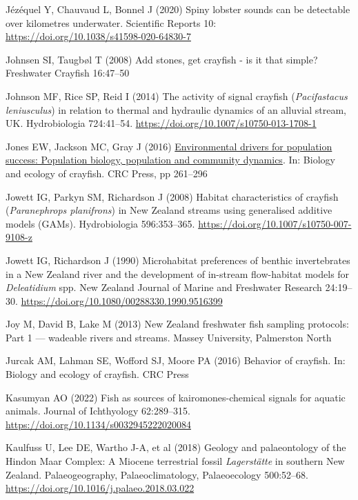 \documentclass[
  12pt,
  a4paper,
  oneside]{scrbook}
\newlength{\cslhangindent}
\newenvironment{CSLReferences}[2] %
 {\begin{list}{}{%
  \setlength{\itemindent}{0pt}
  \setlength{\leftmargin}{0pt}
  \setlength{\parsep}{0pt}
  \ifodd #1
   \setlength{\leftmargin}{\cslhangindent}
   \setlength{\itemindent}{-1\cslhangindent}
  \fi
  \setlength{\itemsep}{#2\baselineskip}}}
 {\end{list}}
\renewenvironment{CSLReferences}[2]
   {\begin{list}{}{%
    \setlength{\itemindent}{0pt}
    \setlength{\leftmargin}{0pt}
    \setlength{\parsep}{0pt}
    \ifodd #1
     \setlength{\leftmargin}{\cslhangindent}
     \setlength{\itemindent}{-1\cslhangindent}
    \fi
    \setlength{\itemsep}{0.3\baselineskip}}}
   {\end{list}}%
\begin{document}
\begin{CSLReferences}{1}{1}
Jézéquel Y, Chauvaud L, Bonnel J (2020) Spiny lobster sounds can be
detectable over kilometres underwater. Scientific Reports 10:
\url{https://doi.org/10.1038/s41598-020-64830-7}

Johnsen SI, Taugbøl T (2008) Add stones, get crayfish - is it that
simple? Freshwater Crayfish 16:47--50

Johnson MF, Rice SP, Reid I (2014) The activity of signal crayfish
({\emph{Pacifastacus leniusculus}}) in relation to thermal and hydraulic
dynamics of an alluvial stream, {UK}. Hydrobiologia 724:41--54.
\url{https://doi.org/10.1007/s10750-013-1708-1}

Jones EW, Jackson MC, Gray J (2016)
\href{https://doi.org/10.1201/b20073-10}{Environmental drivers for
population success: Population biology, population and community
dynamics}. In: Biology and ecology of crayfish. CRC Press, pp 261--296

Jowett IG, Parkyn SM, Richardson J (2008) Habitat characteristics of
crayfish ({\emph{Paranephrops planifrons}}) in {New Zealand} streams
using generalised additive models ({GAMs}). Hydrobiologia 596:353--365.
\url{https://doi.org/10.1007/s10750-007-9108-z}

Jowett IG, Richardson J (1990) Microhabitat preferences of benthic
invertebrates in a {New Zealand} river and the development of in-stream
flow-habitat models for {\emph{Deleatidium}} spp. New Zealand Journal of
Marine and Freshwater Research 24:19--30.
\url{https://doi.org/10.1080/00288330.1990.9516399}

Joy M, David B, Lake M (2013) {New Zealand} freshwater fish sampling
protocols: Part 1 --- wadeable rivers and streams. Massey University,
Palmerston North

Jurcak AM, Lahman SE, Wofford SJ, Moore PA (2016) Behavior of crayfish.
In: Biology and ecology of crayfish. CRC Press

Kasumyan AO (2022) Fish as sources of kairomones-chemical signals for
aquatic animals. Journal of Ichthyology 62:289--315.
\url{https://doi.org/10.1134/s0032945222020084}

Kaulfuss U, Lee DE, Wartho J-A, et al (2018) Geology and palaeontology
of the {Hindon Maar Complex}: A {Miocene} terrestrial fossil
{\emph{Lagerstätte}} in southern {New Zealand}. Palaeogeography,
Palaeoclimatology, Palaeoecology 500:52--68.
\url{https://doi.org/10.1016/j.palaeo.2018.03.022}


\end{CSLReferences}
\end{document}
